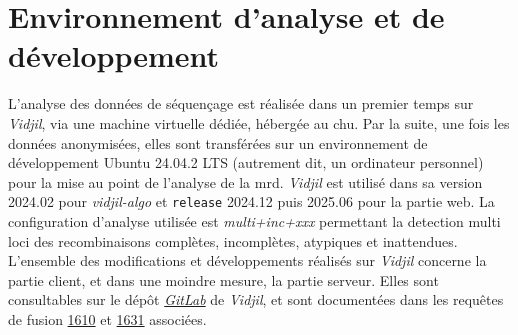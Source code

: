 \section{Environnement d'analyse et de développement}

L'analyse des données de séquençage est réalisée dans un premier temps sur \textit{Vidjil}, via une machine virtuelle dédiée,
hébergée au \gls{chu}. Par la suite, une fois les données anonymisées, elles sont transférées sur un environnement de 
développement Ubuntu 24.04.2 LTS (autrement dit, un ordinateur personnel) pour la mise au point de l'analyse de la \gls{mrd}.
\textit{Vidjil} est utilisé dans sa version 2024.02 pour \textit{vidjil-algo} et \texttt{release} 2024.12 puis 2025.06 pour la partie 
web. La configuration d'analyse utilisée est \textit{multi+inc+xxx} permettant la detection multi loci des recombinaisons complètes, 
incomplètes, atypiques et inattendues.
L'ensemble des modifications et développements réalisés sur \textit{Vidjil} concerne la partie client, et dans une moindre mesure,
la partie serveur. Elles sont consultables sur le dépôt \href{https://gitlab.inria.fr/users/x-benha/activity}{\textit{GitLab}}
de \textit{Vidjil}, et sont documentées dans les requêtes de fusion \href{https://gitlab.inria.fr/vidjil/vidjil/-/merge_requests/1610}{1610}
et \href{https://gitlab.inria.fr/vidjil/vidjil/-/merge_requests/1631}{1631} associées.

